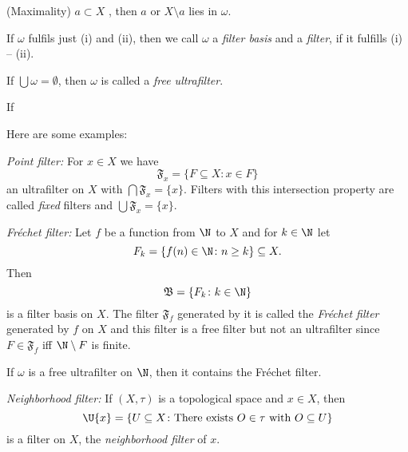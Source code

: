 \documentclass[%
	,english 
	,headings	= small 
	,leqno
	,parskip		= half+
	,DIV			= 14
	,BCOR 			= 10mm	
		]{scrartcl}
\begin{document}
\begin{multicols}{2}
\begin{myenumerate}
	\item (Maximality)
	$ a \subset X$ , then  $ a $ or $X \setminus a$ lies in $\omega$.
	
	\item
	If $ \omega $ fulfils just (i) and (ii), then we call  $ \omega $ a \emph{filter basis} and a \emph{filter}, if it fulfills (i) -- (ii).
	
	\item
	If $ \bigcup \omega = \emptyset $, then $ \omega $ is called a \emph{free ultrafilter}. 
	 
\end{myenumerate}
 

If 

Here are some examples:

\begin{myenumerate}
	

\item
\emph{Point filter: } For $ x \in X $ we have
%
\[
   	  \mathfrak{F}_{ x } = \{ F \subseteq X \colon x \in F \} 
\]
%
an ultrafilter on $ X $ with $ \bigcap  \mathfrak{F}_{ x } = \{ x \} $. 
Filters with this intersection property are called \emph{fixed} filters and $ \bigcup \mathfrak{F}_{ x } = \{ x \}$. 
	
\item
\emph{Fréchet filter: } Let $ f $ be a function from $ \N $ to $ X $ and for $ k \in \N $ let 
%
\[
   	F_{ k } = \{ f(n) \in \N \colon n \geq k \} \subseteq X . 
\]
%
Then 
%
\[
   	\mathfrak{B} = \{ F_{ k } \colon k \in \N \}
\]
%
is a filter basis on $ X $.
The filter $ \mathfrak{F}_{ f } $ generated by it is called the \emph{Fréchet filter} generated by $ f $ on $ X $ and this filter is a free filter but not an ultrafilter since $ F \in \mathfrak{F}_{ f } $ iff $ \N \setminus F $ is finite.

\item
If $ \omega $ is a free ultrafilter on $ \N $, then it contains the Fréchet filter.

%
%	
%	
	
\item
\emph{Neighborhood filter: } If $ ( X , \tau ) $ is a topological space and $ x \in X $, then
%
\[
   	\U{ x } = \{ U \subseteq X \colon \text{There exists $ O \in \tau $ with $ O \subseteq U $} \} 
\]
%
is a filter on $ X $, the \emph{neighborhood filter} of $ x $.
	

\end{myenumerate}
\end{multicols}
\end{document}
